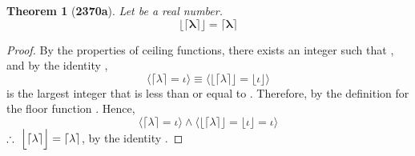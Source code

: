 \documentclass[preview]{standalone}
\newtheorem*{theorem*}{Theorem}
\begin{document}
\begin{theorem*}[\textbf{2370a}]
    Let \bm{$\lambda$} be a real number. 
    \begin{equation*}
        \bm{
            \Big \lfloor \lceil \lambda \rceil \Big \rfloor 
                = 
            \lceil \lambda \rceil
        }
    \end{equation*}
\end{theorem*}

\begin{proof}
    By the properties of ceiling functions,
    there exists an integer \bm{$\iota$} such that
    \bm{$\lceil \lambda \rceil = \iota$}, 
    and by the identity \bm{$\iota$},
    \begin{equation*}
        \bigg \langle \lceil \lambda \rceil = \iota \bigg \rangle
            \equiv
        \bigg \langle 
            \Big \lfloor \lceil \lambda \rceil \Big \rfloor
                =
            \big \lfloor \iota \big \rfloor
        \bigg \rangle
    \end{equation*}
    \bm{$\iota$} is the largest integer that is less than or equal to \bm{$\iota$}.
    Therefore, by the definition for the floor function
    \bm{$\lfloor \iota \rfloor = \iota$}.
    Hence,
    \begin{equation*}
        \bigg \langle \lceil \lambda \rceil = \iota \bigg \rangle
            \land
        \bigg \langle 
            \Big \lfloor \lceil \lambda \rceil \Big \rfloor
                =
            \big \lfloor \iota \big \rfloor
                =
            \iota
        \bigg \rangle
    \end{equation*}
    $\therefore \text{\space} \relax{
        \Big \lfloor \lceil \lambda \rceil \Big \rfloor 
            = 
        \lceil \lambda \rceil
    }$, by the identity \bm{$\iota$}.
\color{lightgray} \end{proof}
\end{document}
